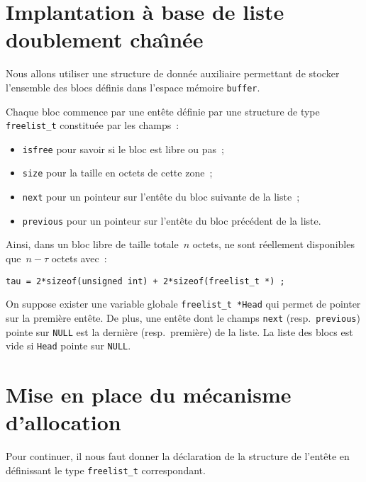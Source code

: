 \documentclass[a4paper]{article}
\begin{document}
\section{Implantation \`a base de liste doublement cha\^\i{}n\'ee}
Nous allons utiliser une structure de donn\'ee auxiliaire permettant
de stocker l'ensemble des blocs d\'efinis dans l'espace m\'emoire
\verb+buffer+.
\par
Chaque bloc commence par une ent\^ete d\'efinie par une structure de
type \verb+freelist_t+ constitu\'ee par les champs~:
\begin{itemize}
\item \verb+isfree+ pour savoir si le bloc est libre ou pas~;
\item \verb+size+ pour la taille en octets de cette zone~;
\item \verb+next+ pour un pointeur sur l'ent\^ete du bloc suivante de
  la liste~;
\item \verb+previous+ pour un pointeur sur l'ent\^ete du bloc
  pr\'ec\'edent de la liste.
\end{itemize}
Ainsi, dans un bloc libre de taille totale~$n$ octets, ne sont
r\'eellement disponibles que~${n-\tau}$ octets avec~:
\begin{verbatim}
tau = 2*sizeof(unsigned int) + 2*sizeof(freelist_t *) ;
\end{verbatim}
\par
On suppose exister une variable globale \verb+freelist_t *Head+ qui
permet de pointer sur la premi\`ere ent\^ete. De plus, une ent\^ete
dont le champs \verb+next+ (resp.\ \verb+previous+) pointe sur
\verb+NULL+ est la derni\`ere (resp.\ premi\`ere) de la liste.  La
liste des blocs est vide si \verb+Head+ pointe sur \verb+NULL+.


\section{Mise en place du m\'ecanisme d'allocation}
Pour continuer, il nous faut donner la d\'eclaration de la structure
de l'ent\^ete en d\'efinissant le type \verb+freelist_t+
correspondant.
\end{document}
